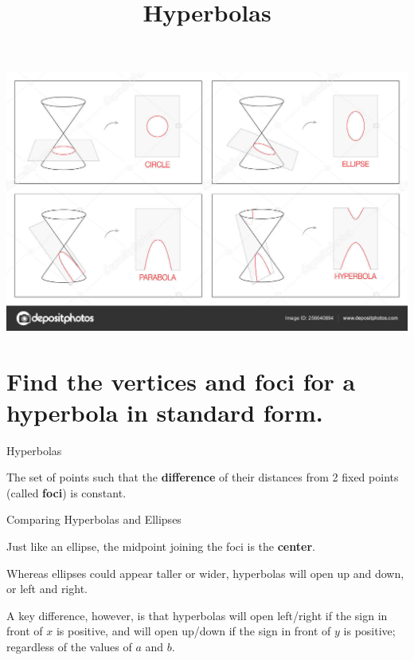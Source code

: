 \documentclass[t,dvipsnames,table]{beamer}
\title{Hyperbolas}
\author{}
\date{}
\begin{document}
\begin{frame} 
\maketitle
\end{frame}

\begin{frame}[c]
\includegraphics[scale=0.80]{Images/conics.jpg}
\end{frame}

\section{Find the vertices and foci for a hyperbola in standard form.}

\begin{frame}{Hyperbolas}
\begin{tcolorbox}[colback=red!10!white, colframe=red!60!black,, title=\textbf{Hyperbolas}]
The set of points such that the \textbf{difference} of their distances from 2 fixed points (called \textbf{foci}) is constant.
\end{tcolorbox}
\vspace{11pt}	\pause
\end{frame}

\begin{frame}{Comparing Hyperbolas and Ellipses}

Just like an ellipse, the midpoint joining the foci is the \textbf{center}.    \newline\\	\pause 

Whereas ellipses could appear taller or wider, hyperbolas will open up and down, or left and right. \newline\\ \pause 

A key difference, however, is that hyperbolas will open left/right if the sign in front of $x$ is positive, and will open up/down if the sign in front of $y$ is positive; regardless of the values of $a$ and $b$.
\end{frame}
\end{document}
